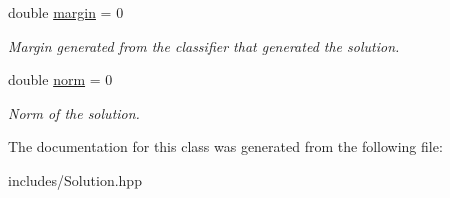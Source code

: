 \begin{DoxyCompactItemize}
\mbox{\label{class_solution_a3580af26a22d86e44df701f654165e0f}} 
double \hyperlink{class_solution_a3580af26a22d86e44df701f654165e0f}{margin} = 0
\begin{DoxyCompactList}\small\item\em Margin generated from the classifier that generated the solution. \end{DoxyCompactList}\item 
\mbox{\label{class_solution_acbc0610c1c2e2d7bb5c39af33b7eb99c}} 
double \hyperlink{class_solution_acbc0610c1c2e2d7bb5c39af33b7eb99c}{norm} = 0
\begin{DoxyCompactList}\small\item\em Norm of the solution. \end{DoxyCompactList}\end{DoxyCompactItemize}


The documentation for this class was generated from the following file\+:\begin{DoxyCompactItemize}
\item 
includes/Solution.\+hpp\end{DoxyCompactItemize}
